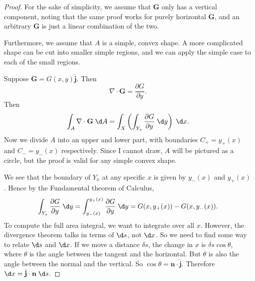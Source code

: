 \documentclass[a4paper]{article}
\begin{document}
\begin{proof}
  For the sake of simplicity, we assume that $\mathbf{G}$ only has a vertical component, noting that the same proof works for purely horizontal $\mathbf{G}$, and an arbitrary $\mathbf{G}$ is just a linear combination of the two.

  Furthermore, we assume that $A$ is a simple, convex shape. A more complicated shape can be cut into smaller simple regions, and we can apply the simple case to each of the small regions.

  Suppose $\mathbf{G} = G(x, y)\hat{\mathbf{j}}$. Then
  \[
    \nabla \cdot \mathbf{G} = \frac{\partial G}{\partial y}.
  \]
  Then
  \[
    \int_A \nabla\cdot \mathbf{G}\;\d A = \int_X \left(\int_{Y_x}\frac{\partial G}{\partial y}\;\d y\right)\;\d x.
  \]
  Now we divide $A$ into an upper and lower part, with boundaries $C_+ = y_+(x)$ and $C_- = y_-(x)$ respectively. Since I cannot draw, $A$ will be pictured as a circle, but the proof is valid for any simple convex shape.
  \begin{center}
  \end{center}
  We see that the boundary of $Y_x$ at any specific $x$ is given by $y_-(x)$ and $y_+(x)$. Hence by the Fundamental theorem of Calculus,
  \[
    \int_{Y_x}\frac{\partial G}{\partial y}\;\d y = \int_{y_-(x)}^{y_+(x)} \frac{\partial G}{\partial y}\;\d y = G(x, y_+(x)) - G(x, y_-(x)).
  \]
  To compute the full area integral, we want to integrate over all $x$. However, the divergence theorem talks in terms of $\d s$, not $\d x$. So we need to find some way to relate $\d s$ and $\d x$. If we move a distance $\delta s$, the change in $x$ is $\delta s\cos \theta$, where $\theta$ is the angle between the tangent and the horizontal. But $\theta$ is also the angle between the normal and the vertical. So $\cos \theta = \mathbf{n}\cdot \hat{\mathbf{j}}$. Therefore $\d x = \hat{\mathbf{j}}\cdot \mathbf{n}\;\d s$.


\end{proof}
\end{document}
